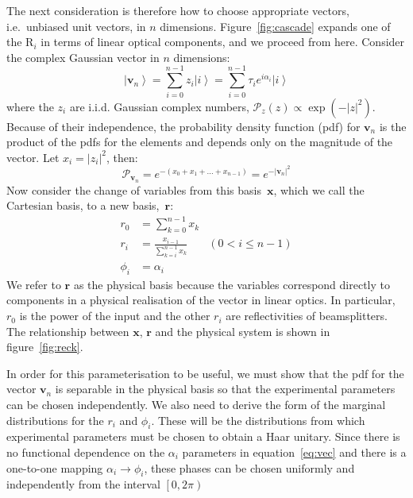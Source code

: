 \documentclass[aps,prl,twocolumn,floatfix]{revtex4}
\renewcommand{\vec}[1]{\mathbf{#1}}
\newcommand{\mat}[1]{\mathrm{#1}}
\newcommand{\of}[1]{\!\left(#1\right)}
\newcommand{\pdf}{{pdf}}
\newcommand{\abs}[1]{\left|#1\right|}
\newcommand{\prob}[1]{\mathcal{#1}}
\newcommand{\ket}[1]{\left|#1\right\rangle}
\begin{document}
The next consideration is therefore how to choose appropriate vectors, i.e.\
unbiased unit vectors, in \(n\) dimensions. Figure~\ref{fig:cascade} expands one
of the \(\mat{R}_{i}\) in terms of linear optical components, and we proceed
from here. Consider the complex Gaussian vector in \(n\) dimensions:
\begin{equation}
  \ket{\vec{v}_{n}} = \sum_{i=0}^{n-1} z_{i} \ket{i} = \sum_{i=0}^{n-1} \tau_{i}
  e^{i \alpha_{i}} \ket{i}
\end{equation}
where the \(z_i\) are i.i.d. Gaussian complex numbers, \( \prob{P}_{z} \of{z}
\propto \exp \left( -\abs{z}^2 \right) \). Because of their independence, the
probability density function (\pdf{}) for \(\vec{v}_n\) is the product of the
\pdf{}s for the elements and depends only on the magnitude of the vector. Let
\(x_i = \abs{z_i}^2 \), then:
\begin{equation}
  \label{eq:vec}
  \prob{P}_{\vec{v}_n} = e^{ -\left(x_0 + x_1 + \dots + x_{n-1} \right)} = e^{
  -\abs{\vec{v}_n}^2}
\end{equation}
Now consider the change of variables from this basis~\(\vec{x}\), which we call
the Cartesian basis, to a new basis,~\(\vec{r}\):
\begin{align}
  r_0 &= \sum_{k=0}^{n-1} x_k \\
  r_i &= \frac{x_{i-1}}{\sum_{k=i}^{n-1} x_k} & \left( 0 < i \leq n-1 \right) \\
  \phi_i &= \alpha_{i}
\end{align}
We refer to \(\vec{r}\) as the physical basis because the variables
correspond directly to components in a physical realisation of the vector in
linear optics. In particular, \(r_0\) is the power of the input and the other
\(r_i\) are reflectivities of beamsplitters. The relationship between
\(\vec{x}\), \(\vec{r}\) and the physical system is shown in
figure~\ref{fig:reck}.

In order for this parameterisation to be useful, we must show that the \pdf{}
for the vector \(\vec{v}_n\) is separable in the physical basis so that the
experimental parameters can be chosen independently. We also need to derive the
form of the marginal distributions for the \(r_i\) and \(\phi_{i}\). These will
be the distributions from which experimental parameters must be chosen to
obtain a Haar unitary. Since there is no functional dependence on the
\(\alpha_{i}\) parameters in equation~\ref{eq:vec} and there is a one-to-one
mapping \(\alpha_{i} \rightarrow \phi_{i}\), these phases can be chosen
uniformly and independently from the interval \(\left[0,2\pi\right)\)
\end{document}
